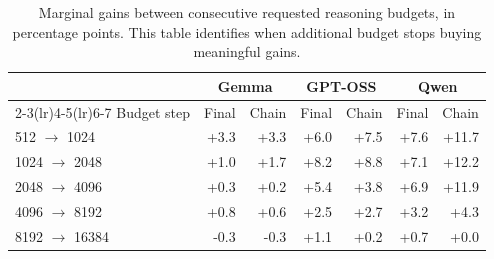 \begin{table}[t]
    \centering
    \caption{Marginal gains between consecutive requested reasoning budgets, in percentage points. This table identifies when additional budget stops buying meaningful gains.}
    \label{tab:marginal-budget}
    \small
    \begin{tabular}{lrrrrrr}
        \toprule
        & \multicolumn{2}{c}{Gemma} & \multicolumn{2}{c}{GPT-OSS} & \multicolumn{2}{c}{Qwen} \\
        \cmidrule(lr){2-3}\cmidrule(lr){4-5}\cmidrule(lr){6-7}
        Budget step & Final & Chain & Final & Chain & Final & Chain \\
        \midrule
        512 $\rightarrow$ 1024 & +3.3 & +3.3 & +6.0 & +7.5 & +7.6 & +11.7 \\
        1024 $\rightarrow$ 2048 & +1.0 & +1.7 & +8.2 & +8.8 & +7.1 & +12.2 \\
        2048 $\rightarrow$ 4096 & +0.3 & +0.2 & +5.4 & +3.8 & +6.9 & +11.9 \\
        4096 $\rightarrow$ 8192 & +0.8 & +0.6 & +2.5 & +2.7 & +3.2 & +4.3 \\
        8192 $\rightarrow$ 16384 & -0.3 & -0.3 & +1.1 & +0.2 & +0.7 & +0.0 \\
        \bottomrule
    \end{tabular}
\end{table}
